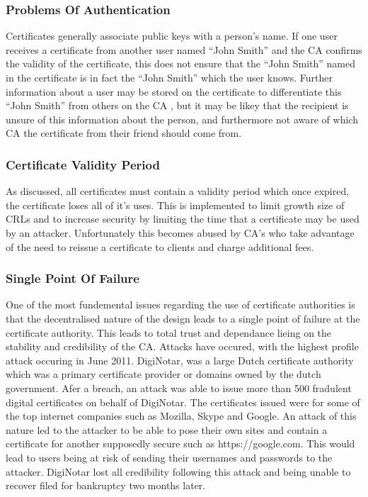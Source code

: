 \subsubsection{Problems Of Authentication}

Certificates generally associate public keys with a person’s name. If one user receives a certificate from another user named “John Smith” and the CA confirms the validity of the certificate, this does not ensure that the “John Smith” named in the certificate is in fact the “John Smith” which the user knows. Further information about a user may be stored on the certificate to differentiate this “John Smith” from others on the CA , but it may be likey that the recipient is unsure of this information about the person, and furthermore not aware of which CA the certificate from their friend should come from.

\subsubsection{Certificate Validity Period}

As discussed, all certificates must contain a validity period which once expired, the certificate loses all of it’s uses. This is implemented to limit growth size of CRLs and to increase security by limiting the time that a certificate may be used by an attacker. Unfortunately this becomes abused by CA’s who take advantage of the need to reissue a certificate to clients and charge additional fees.

\subsubsection{Single Point Of Failure}
One of the most fundemental issues regarding the use of certificate authorities is that the decentralised nature of the design leads to a single point of failure at the certificate authority. This leads to total trust and dependance lieing on the stability and credibility of the CA. Attacks have occured, with the highest profile attack occuring in June 2011. DigiNotar, was a large Dutch certificate authority which was a primary certificate provider or domains owned by the dutch government. Afer a breach, an attack was able to issue more than 500 fradulent digital certificates on behalf of DigiNotar. The certificates issued were for some of the top internet companies such as Mozilla, Skype and Google. An attack of this nature led to the attacker to be able to pose their own sites and contain a certificate for another supposedly secure such as https://google.com. This would lead to users being at risk of sending their usernames and passwords to the attacker. DigiNotar lost all credibility following this attack and being unable to recover filed for bankruptcy two months later.
